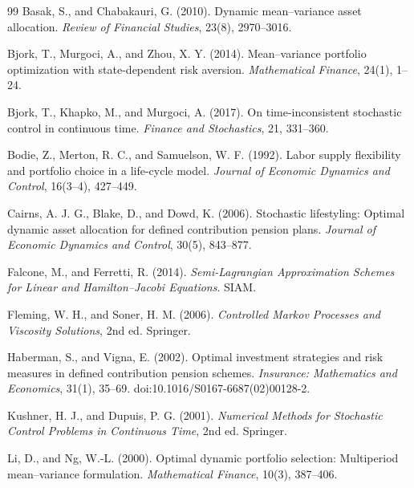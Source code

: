 \documentclass[10pt,a4paper]{article}
\numberwithin{equation}{section}
\numberwithin{table}{section}
\numberwithin{figure}{section}
\theoremstyle{plain}
\theoremstyle{definition}
\begin{document}
\begingroup\footnotesize\setlength{\bibsep}{1pt}\begin{thebibliography}{99}
Basak, S., and Chabakauri, G. (2010).
Dynamic mean--variance asset allocation.
\emph{Review of Financial Studies}, 23(8), 2970--3016.

Bjork, T., Murgoci, A., and Zhou, X. Y. (2014).
Mean--variance portfolio optimization with state-dependent risk aversion.
\emph{Mathematical Finance}, 24(1), 1--24.

Bjork, T., Khapko, M., and Murgoci, A. (2017).
On time-inconsistent stochastic control in continuous time.
\emph{Finance and Stochastics}, 21, 331--360.

Bodie, Z., Merton, R. C., and Samuelson, W. F. (1992).
Labor supply flexibility and portfolio choice in a life-cycle model.
\emph{Journal of Economic Dynamics and Control}, 16(3--4), 427--449.

Cairns, A. J. G., Blake, D., and Dowd, K. (2006).
Stochastic lifestyling: Optimal dynamic asset allocation for defined contribution pension plans.
\emph{Journal of Economic Dynamics and Control}, 30(5), 843--877.

Falcone, M., and Ferretti, R. (2014).
\emph{Semi-Lagrangian Approximation Schemes for Linear and Hamilton--Jacobi Equations}.
SIAM.

Fleming, W. H., and Soner, H. M. (2006).
\emph{Controlled Markov Processes and Viscosity Solutions}, 2nd ed.
Springer.

Haberman, S., and Vigna, E. (2002).
Optimal investment strategies and risk measures in defined contribution pension schemes.
\emph{Insurance: Mathematics and Economics}, 31(1), 35--69.
doi:10.1016/S0167-6687(02)00128-2.

Kushner, H. J., and Dupuis, P. G. (2001).
\emph{Numerical Methods for Stochastic Control Problems in Continuous Time}, 2nd ed.
Springer.

Li, D., and Ng, W.-L. (2000).
Optimal dynamic portfolio selection: Multiperiod mean--variance formulation.
\emph{Mathematical Finance}, 10(3), 387--406.


\end{thebibliography}
\end{document}
